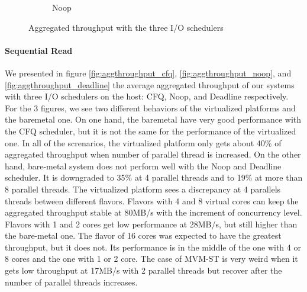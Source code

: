\documentclass{acmsig}
\begin{document}
\begin{figure}[t]
\begin{subfigure}[b]{0.3\textwidth}
     \caption{Noop}
     \label{fig:aggthroughput_noop_write}
   \end{subfigure}   
   \caption{Aggregated throughput with the three I/O schedulers}\label{fig:aggthroughput}
\end{figure}

\paragraph{Sequential Read}
We presented in figure \ref{fig:aggthroughput_cfq}, \ref{fig:aggthroughput_noop}, and \ref{fig:aggthroughput_deadline} the average aggregated throughput of our systems with three I/O schedulers on the host: CFQ, Noop, and Deadline respectively. For the 3 figures, we see two different behaviors of the virtualized platforms and the baremetal one. On one hand, the baremetal have very good performance with the CFQ scheduler, but it is not the same for the performance of the virtualized one. In all of the screnarios, the virtualized platform only gets about 40\% of aggregated throughput when number of parallel thread is increased. On the other hand, bare-metal system does not perform well with the Noop and Deadline scheduler. It is downgraded to 35\% at 4 parallel threads and to 19\% at more than 8 parallel threads. The virtualized platform sees a discrepancy at 4 parallels threads between different flavors. Flavors with 4 and 8 virtual cores can keep the aggregated throughput stable at 80MB/s with the increment of concurrency level. Flavors with 1 and 2 cores get low performance at 28MB/s, but still higher than the bare-metal one. The flavor of 16 cores was expected to have the greatest throughput, but it does not. Its performance is in the middle of the one with 4 or 8 cores and the one with 1 or 2 core. The case of MVM-ST is very weird when it gets low throughput at 17MB/s with 2 parallel threads but recover after the number of parallel threads increases.
\end{document}

